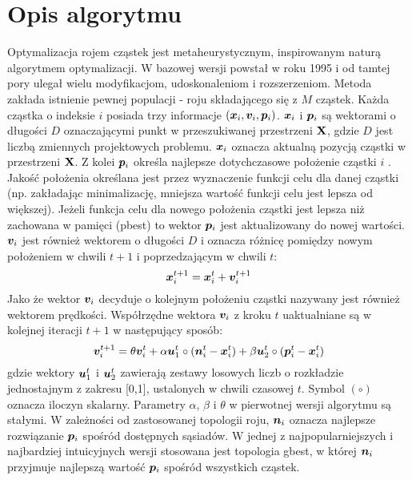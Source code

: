 \section{Opis algorytmu}
Optymalizacja rojem cząstek  jest metaheurystycznym, inspirowanym naturą algorytmem optymalizacji. W bazowej wersji powstał w roku 1995 \parencite{Kennedy1995a,Eberhart1995} i od tamtej pory ulegał wielu modyfikacjom, udoskonaleniom i rozszerzeniom. Metoda zakłada istnienie pewnej populacji - roju składającego się z $M$ cząstek. Każda cząstka o indeksie $i$ posiada trzy informacje $(\bm{x}_i,\bm{v}_i,\bm{p}_i)$. $\bm{x}_i$ i $\bm{p}_i$ są wektorami o długości $D$ oznaczającymi punkt w przeszukiwanej przestrzeni $\mathbf{X}$, gdzie $D$ jest liczbą zmiennych projektowych problemu. $\bm{x}_i$ oznacza aktualną pozycją cząstki w przestrzeni $\mathbf{X}$. Z kolei $\bm{p}_i$ określa najlepsze dotychczasowe położenie cząstki $i$ . Jakość położenia określana jest przez wyznaczenie funkcji celu dla danej cząstki (np. zakładając minimalizację, mniejsza wartość funkcji celu jest lepsza od większej). Jeżeli funkcja celu dla nowego położenia cząstki jest lepsza niż zachowana w pamięci (pbest) to wektor $\bm{p}_i$ jest aktualizowany do nowej wartości. $\bm{v}_i$ jest również wektorem o długości $D$ i oznacza różnicę pomiędzy nowym położeniem w chwili $t+1$ i poprzedzającym w chwili $t$:
\begin{equation} \label{eq: pso_position}
	\bm{x}_i^{t+1}=\bm{x}_i^t+\bm{v}_i^{t+1}
\end{equation}
 Jako że wektor $\bm{v}_i$ decyduje o kolejnym położeniu cząstki nazywany jest również wektorem prędkości. Współrzędne wektora $\bm{v}_i$ z kroku $t$ uaktualniane są w kolejnej iteracji $t+1$ w następujący sposób:
\begin{equation} \label{eq: pso_velocity}
	\bm{v}_{i}^{t+1}=\theta\bm{v}_i^t+\alpha\bm{u}_1^t\circ (\bm{n}_i^t-\bm{x}_i^t)+\beta\bm{u}_2^t\circ(\bm{p}_i^t-\bm{x}_i^t)
\end{equation}
gdzie wektory $\bm{u}_1^t$ i $\bm{u}_2^t$ zawierają zestawy losowych liczb o rozkładzie jednostajnym z zakresu [0,1], ustalonych w chwili czasowej $t$. Symbol $(\circ)$ oznacza iloczyn skalarny. Parametry $\alpha$, $\beta$ i $\theta$ w pierwotnej wersji algorytmu są stałymi. W zależności od zastosowanej topologii roju, $\bm{n}_i$ oznacza najlepsze rozwiązanie $\bm{p}_i$ spośród dostępnych sąsiadów. W jednej z najpopularniejszych i najbardziej intuicyjnych wersji stosowana jest topologia gbest, w której $\bm{n}_i$ przyjmuje najlepszą wartość $\bm{p}_i$ spośród wszystkich cząstek.
